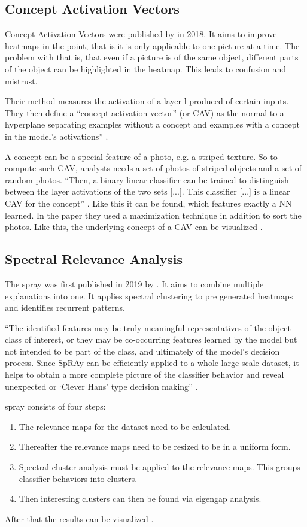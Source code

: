 \subsection{Concept Activation Vectors}
Concept Activation Vectors were published by  in 2018. It aims to improve heatmaps in the point, that is it is only applicable to one picture at a time. The problem with that is, that even if a picture is of the same object, different parts of the object can be highlighted in the heatmap. This leads to confusion and mistrust.
\par
Their method measures the activation of a layer l produced of certain inputs. They then define a “concept activation vector” (or CAV) as the normal to a hyperplane separating examples without a concept and examples with a concept in the model’s activations” \cite[3]{Kim.2018}.
\par
A concept can be a special feature of a photo, e.g. a striped texture. So to compute such CAV, analysts needs a set of photos of striped objects and a set of random photos.
“Then, a binary linear classifier can be trained to distinguish between the layer activations of the two sets 
[...].
This classifier 
[...]
is a linear CAV for the concept” \cite[3]{Kim.2018}. Like this it can be found, which features exactly a NN learned.
In the paper they used a maximization technique in addition to sort the photos. Like this, the  underlying concept of a CAV can be visualized \cite{Kim.2018}.

\subsection{Spectral Relevance Analysis}
The \gls{spray} was first published in 2019 by . It aims to combine multiple explanations into one. It applies spectral clustering to pre generated heatmaps and identifies recurrent patterns. 
\par
“The identified features may be truly meaningful representatives of the object class of interest, or they may be co-occurring features learned by the model but not intended to be part of the class, and ultimately of the model’s decision process. Since SpRAy can be efficiently applied to a whole large-scale dataset, it helps to obtain a more complete picture of the classifier behavior and reveal unexpected or ‘Clever Hans’ type decision making” \cite[8]{Lapuschkin.2019}.
\par
\gls{spray} consists of four steps:
\begin{enumerate}
    \item The relevance maps for the dataset need to be calculated.
    \item Thereafter the relevance maps need to be resized to be in a uniform form.
    \item Spectral cluster analysis must be applied to the relevance maps. This groups classifier behaviors into clusters.
    \item Then interesting clusters can then be found via eigengap analysis.
\end{enumerate}
After that the results can be visualized \cite{Lapuschkin.2019}.
